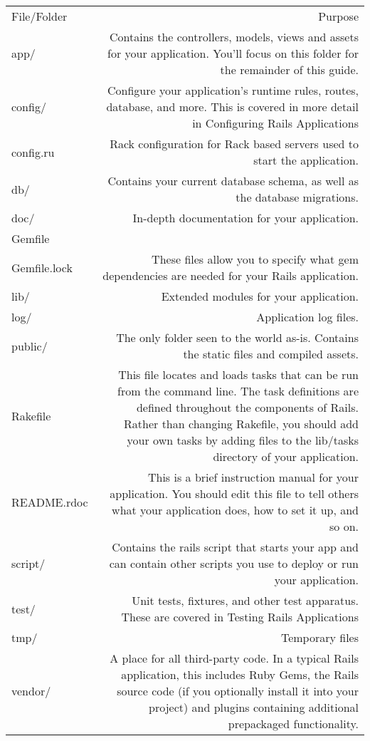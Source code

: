 \documentclass[serif,mathserif]{article}
\begin{document}
\begin{tabular}{ l |  r } 
File/Folder & Purpose \\
app/ & Contains the controllers, models, views and assets for your application. You’ll focus on this folder for the remainder of this guide. \\
config/ & Configure your application’s runtime rules, routes, database, and more. This is covered in more detail in Configuring Rails Applications \\
config.ru & Rack configuration for Rack based servers used to start the application.\\
db/ & Contains your current database schema, as well as the database migrations.\\
doc/ & In-depth documentation for your application.\\
Gemfile\\
Gemfile.lock & These files allow you to specify what gem dependencies are needed for your Rails application.\\
lib/ & Extended modules for your application.\\
log/ & Application log files.\\
public/ & The only folder seen to the world as-is. Contains the static files and compiled assets.\\
Rakefile & This file locates and loads tasks that can be run from the command line. The task definitions are defined throughout the components of Rails. Rather than changing Rakefile, you should add your own tasks by adding files to the lib/tasks directory of your application.\\
README.rdoc & This is a brief instruction manual for your application. You should edit this file to tell others what your application does, how to set it up, and so on.\\
script/ & Contains the rails script that starts your app and can contain other scripts you use to deploy or run your application.\\
test/ & Unit tests, fixtures, and other test apparatus. These are covered in Testing Rails Applications\\
tmp/ & Temporary files\\
vendor/ & A place for all third-party code. In a typical Rails application, this includes Ruby Gems, the Rails source code (if you optionally install it into your project) and plugins containing additional prepackaged functionality.\\
\end{tabular}
\end{document}
